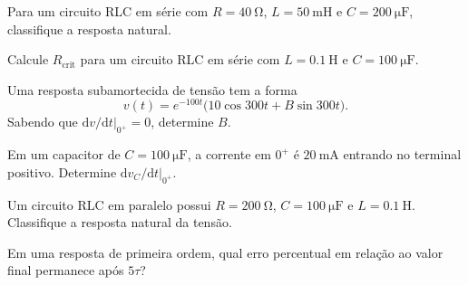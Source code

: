 \begin{questao}[2]{}
Para um circuito RLC em série com $R=\SI{40}{\ohm}$, $L=\SI{50}{\milli\henry}$ e
$C=\SI{200}{\micro\farad}$, classifique a resposta natural.
\end{questao}

\begin{questao}[2]{}
Calcule $R_{\mathrm{crit}}$ para um circuito RLC em série com $L=\SI{0.1}{\henry}$ e
$C=\SI{100}{\micro\farad}$.
\end{questao}

\begin{questao}[2]{}
Uma resposta subamortecida de tensão tem a forma
\[
v(t)=e^{-100t}\big(10\cos300t+B\sin300t\big).
\]
Sabendo que $\mathrm{d}v/\mathrm{d}t|_{0^+}=0$, determine $B$.
\end{questao}

\begin{questao}[2]{}
Em um capacitor de $C=\SI{100}{\micro\farad}$, a corrente em $0^+$ é
$\SI{20}{\milli\ampere}$ entrando no terminal positivo. Determine
$\mathrm{d}v_C/\mathrm{d}t|_{0^+}$.
\end{questao}

\begin{questao}[2]{}
Um circuito RLC em paralelo possui $R=\SI{200}{\ohm}$, $C=\SI{100}{\micro\farad}$ e
$L=\SI{0.1}{\henry}$. Classifique a resposta natural da tensão.
\end{questao}

\begin{questao}[2]{}
Em uma resposta de primeira ordem, qual erro percentual em relação ao valor final
permanece após $5\tau$?
\end{questao}

